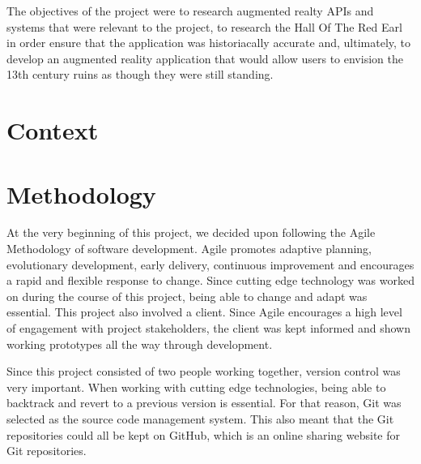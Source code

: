 The objectives of the project were to research augmented realty APIs and systems that were relevant to the project, to research the Hall Of The Red Earl in order ensure that the application was historiacally accurate and, ultimately, to develop an augmented reality application that would allow users to envision the 13th century ruins as though they were still standing. 
\chapter{Context}

\chapter{Methodology}
At the very beginning of this project, we decided upon following the Agile Methodology of software development. Agile promotes adaptive planning, evolutionary development, early delivery, continuous improvement and encourages a rapid and flexible response to change. Since cutting edge technology was worked on during the course of this project, being able to change and adapt was essential. This project also involved a client. Since Agile encourages a high level of engagement with project stakeholders, the client was kept informed and shown working prototypes all the way through development.

Since this project consisted of two people working together, version control was very important. When working with cutting edge technologies, being able to backtrack and revert to a previous version is essential. For that reason, Git was selected as the source code management system. This also meant that the Git repositories could all be kept on GitHub, which is an online sharing website for Git repositories.

